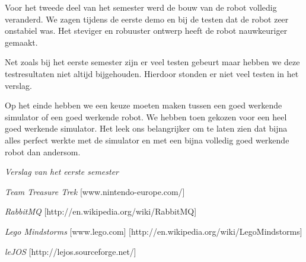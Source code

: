 \documentclass[eind]{penoverslag}
\begin{document}
Voor het tweede deel van het semester werd de bouw van de robot volledig veranderd. We zagen tijdens de eerste demo en bij de testen dat de robot zeer onstabiel was. Het steviger en robuuster ontwerp heeft de robot nauwkeuriger gemaakt. 

Net zoals bij het eerste semester zijn er veel testen gebeurt maar hebben we deze testresultaten niet altijd bijgehouden. Hierdoor stonden er niet veel testen in het verslag.

Op het einde hebben we een keuze moeten maken tussen een goed werkende simulator of een goed werkende robot. We hebben toen gekozen voor een heel goed werkende simulator. Het leek ons belangrijker om te laten zien dat bijna alles perfect werkte met de simulator en met een bijna volledig goed werkende robot dan andersom. 

\begin{thebibliography}{9}

\textit{Verslag van het eerste semester}

\textit{Team Treasure Trek} \mbox{[www.nintendo-europe.com/]}

\textit{RabbitMQ} \mbox{[http://en.wikipedia.org/wiki/RabbitMQ]}

\textit{Lego Mindstorms} \mbox{[www.lego.com]} \mbox{[http://en.wikipedia.org/wiki/Lego\textendash Mindstorms]}

\textit{leJOS} \mbox{[http://lejos.sourceforge.net/]}

\end{thebibliography}
\end{document}
